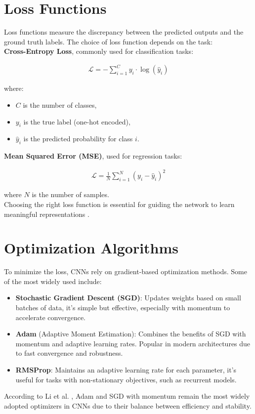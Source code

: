 \section{Loss Functions}

Loss functions measure the discrepancy between the predicted outputs and the ground truth labels.
The choice of loss function depends on the task:
\\
\textbf{Cross-Entropy Loss}, commonly used for classification tasks:

\begin{align}
    \mathcal{L} = - \sum_{i=1}^C y_i \cdot \log(\hat{y}_i)
\end{align}

where:

\begin{itemize}
    \item $C$ is the number of classes,
    \item $y_i$ is the true label (one-hot encoded),
    \item $\hat{y}_i$ is the predicted probability for class $i$.
\end{itemize}

\textbf{Mean Squared Error (MSE)}, used for regression tasks:

\begin{align}
    \mathcal{L} = \frac{1}{N} \sum_{i=1}^N (y_i - \hat{y}_i)^2
\end{align}

where $N$ is the number of samples.
\\
Choosing the right loss function is essential for guiding the network to learn meaningful representations \cite{goodfellow2016deep}.

\section{Optimization Algorithms}

To minimize the loss, CNNs rely on gradient-based optimization methods.
Some of the most widely used include:
\begin{itemize}
    \item \textbf{Stochastic Gradient Descent (SGD)}:
        Updates weights based on small batches of data, it's simple but effective, especially with momentum to accelerate convergence.
    \item \textbf{Adam} (Adaptive Moment Estimation):
        Combines the benefits of SGD with momentum and adaptive learning rates. Popular in modern architectures due to fast convergence and robustness.
    \item \textbf{RMSProp}:
        Maintains an adaptive learning rate for each parameter, it's useful for tasks with non-stationary objectives, such as recurrent models.
\end{itemize}

According to Li et al. \cite{li2021survey}, Adam and SGD with momentum remain the most widely adopted optimizers in CNNs due to their balance between efficiency and stability.